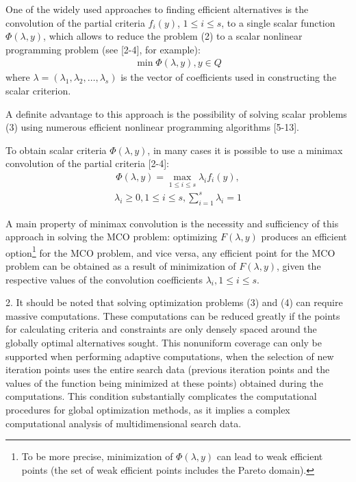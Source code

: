 \documentclass{aip-cp}
\begin{document}
One of the widely used approaches to finding efficient alternatives is the convolution of the partial criteria $f_i(y)$, $1 \leq i \leq s$, to a single scalar function $\Phi(\lambda, y)$, which allows to reduce the problem (2) to a scalar nonlinear programming problem (see [2-4], for example):
\begin{eqnarray}
\min \Phi(\lambda, y), y \in Q
\end{eqnarray}
where $\lambda = (\lambda_1,\lambda_2,\dots,\lambda_s)$ is the vector of coefficients used in constructing the scalar criterion. \par

A definite advantage to this approach is the possibility of solving scalar problems (3) using numerous efficient nonlinear programming algorithms [5-13]. \par

To obtain scalar criteria $\Phi(\lambda, y)$, in many cases it is possible to use a minimax convolution of the partial criteria [2-4]:
\begin{eqnarray}
\Phi(\lambda, y) = \max_{1 \leq i \leq s} \lambda_i  f_i(y),
\end{eqnarray}
\begin{eqnarray*}
\lambda_i \geq 0, 1 \leq i \leq s, \sum\limits_{i=1}^s \lambda_i = 1 
\end{eqnarray*}

A main property of minimax convolution is the necessity and sufficiency of this approach in solving the MCO problem: optimizing $F(\lambda, y)$ produces an efficient option\footnote{To be more precise, minimization of $\Phi(\lambda, y)$ can lead to  weak efficient points (the set of weak efficient points includes the Pareto domain). } for the MCO problem, and vice versa, any efficient point for the MCO problem can be obtained as a result of minimization of $F(\lambda, y)$, given the respective values of the convolution coefficients $\lambda_i, 1 \leq i \leq s$. \par
2. It should be noted that solving optimization problems (3) and (4) can require massive computations. These computations can be reduced greatly if the points for calculating criteria and constraints are only densely spaced around the globally optimal alternatives sought. This nonuniform coverage can only be supported when performing adaptive computations, when the selection of new iteration points uses the entire search data (previous iteration points and the values of the function being minimized at these points) obtained during the computations. This condition substantially complicates the computational procedures for global optimization methods, as it implies a complex computational analysis of multidimensional search data. \par
\end{document}
